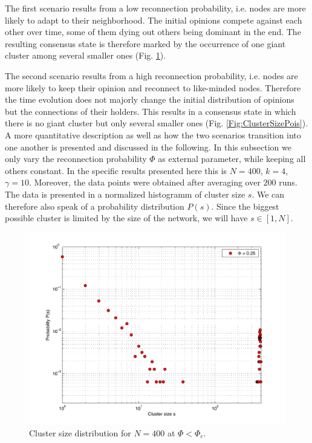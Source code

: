 \documentclass[11pt]{article}
\begin{document}
The first scenario results from a low reconnection probability, i.e. nodes are more likely to adapt to their neighborhood. The initial opinions compete against each other over time, some of them dying out others being dominant in the end. The resulting consensus state is therefore marked by the occurrence of one giant cluster among several smaller ones (Fig. \ref{Fig:ClusterSizeBig}). 

The second scenario results from a high reconnection probability, i.e. nodes are more likely to keep their opinion and reconnect to like-minded nodes. Therefore the time evolution does not majorly change the initial distribution of opinions but the connections of their holders. This results in a consensus state in which there is no giant cluster but only several smaller ones (Fig. \ref{Fig:ClusterSizePois}).\\

A more quantitative description as well as how the two scenarios transition into one another is presented and discussed in the following. In this subsection we only vary the reconnection probability $\Phi$ as external parameter, while keeping all others constant. In the specific results presented here this is $N=400$, $k=4$, $\gamma=10$. Moreover, the data points were obtained after averaging over $200$ runs. The data is presented in a normalized histogramm of cluster size $s$. We can therefore also speak of a probability distribution $P(s)$. Since the biggest possible cluster is limited by the size of the network, we will have $s\in[1,N]$.\\

\begin{figure}[h!]
  \centering
    \includegraphics[scale=0.7]{Plots/S_Big.pdf}
  \caption{Cluster size distribution for $N=400$ at $\Phi<\Phi_c$.}
  \label{Fig:ClusterSizeBig}
\end{figure}
\end{document}

